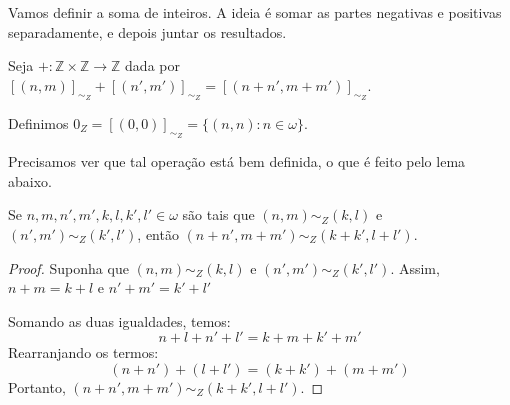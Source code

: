 Vamos definir a soma de inteiros.
A ideia é somar as partes negativas e positivas separadamente, e depois juntar os resultados.
\begin{definition}
    Seja $+:\mathbb Z\times \mathbb Z\to \mathbb Z$ dada por $[(n, m)]_{\sim_Z}+[(n', m')]_{\sim_Z}=[(n+n', m+m')]_{\sim_Z}$.

    Definimos $0_Z=[(0, 0)]_{\sim_Z}=\{(n, n): n \in \omega\}$.
\end{definition}
Precisamos ver que tal operação está bem definida, o que é feito pelo lema abaixo.

\begin{lemma}[$Z^-$]\label{lem:operacaoSomaNosInteirosBemDefinida}
    Se $n, m, n', m', k, l, k', l' \in \omega$ são tais que $(n, m)\sim_Z (k, l)$ e $(n', m')\sim_Z (k', l')$, então $(n+n', m+m')\sim_Z (k+k', l+l')$.
\end{lemma}
\begin{proof}
    Suponha que $(n, m)\sim_Z (k, l)$ e $(n', m')\sim_Z (k', l')$.
    Assim, $n+m=k+l$ e $n'+m'=k'+l'$

    Somando as duas igualdades, temos:
    \[
        n+l+n'+l' = k+m+k'+m'
    \]
    Rearranjando os termos:
    \[
        (n+n')+(l+l') = (k+k')+(m+m')
    \]
    Portanto, $(n+n', m+m')\sim_Z (k+k', l+l')$.
\end{proof}

